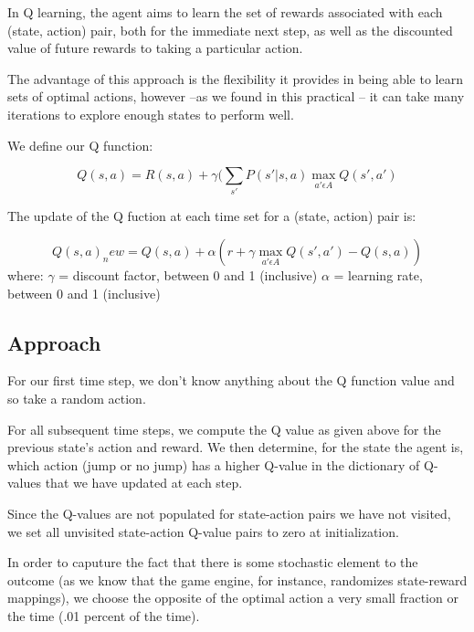 \documentclass[11pt, oneside]{article}   	%
\begin{document}
In Q learning, the agent aims to learn the set of rewards associated with each (state, action) pair, both for the immediate next step, as well as the discounted value of future rewards to taking a particular action.

The advantage of this approach is the flexibility it provides in being able to learn sets of optimal actions, however --as we found in this practical -- it can take many iterations to explore enough states to perform well.

We define our Q function:

\begin{equation}\label{reio}
Q(s,a) = R(s,a) +  \gamma (\sum_{s \prime} P(s\prime | s, a) \max_{a\prime \epsilon A} Q(s \prime, a \prime)
\end{equation}

The update of the Q fuction at each time set for a (state, action) pair is:

\begin{equation}\label{reio}
Q(s,a)_new = Q(s,a) +  \alpha (r + \gamma \max_{a\prime \epsilon A} Q(s \prime, a \prime) - Q(s,a))
\end{equation}
\newline
where:
\newline
$\gamma$ = discount factor, between 0 and 1 (inclusive)
\newline
$\alpha$ = learning rate, between 0 and 1 (inclusive)
\newline

\subsection*{Approach}

For our first time step, we don't know anything about the Q function value and so take a random action.

For all subsequent time steps, we compute the Q value as given above for the previous state's action and reward. We then determine, for the state the agent is, which action (jump or no jump) has a higher Q-value in the dictionary of Q-values that we have updated at each step.

Since the Q-values are not populated for state-action pairs we have not visited, we set all unvisited state-action Q-value pairs to zero at initialization.

In order to caputure the fact that there is some stochastic element to the outcome (as we know that the game engine, for instance, randomizes state-reward mappings), we choose the opposite of the optimal action a very small fraction or the time (.01 percent of the time).
\end{document}
